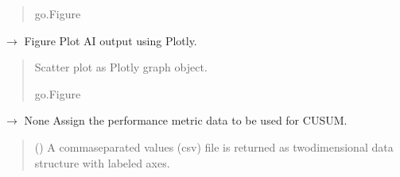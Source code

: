 \documentclass[letterpaper,10pt,oneside,english]{sphinxmanual}
\begin{document}
\begin{fulllineitems}
\begin{fulllineitems}
\begin{quote}
\begin{description}
\sphinxAtStartPar
go.Figure

\end{description}\end{quote}

\end{fulllineitems}


\begin{fulllineitems}
\label{\detokenize{ref_cusum:package.cusum.CUSUM.plot_input_metric_plotly_raw}}
\pysigstartsignatures
\pysiglinewithargsret
{}
{}
{{ $\rightarrow$ Figure}}
\pysigstopsignatures
\sphinxAtStartPar
Plot AI output using Plotly.
\begin{quote}\begin{description}
\sphinxAtStartPar
Scatter plot as Plotly graph object.

\sphinxAtStartPar
go.Figure

\end{description}\end{quote}

\end{fulllineitems}


\begin{fulllineitems}
\label{\detokenize{ref_cusum:package.cusum.CUSUM.set_df_metric_csv}}
\pysigstartsignatures
\pysiglinewithargsret
{}
{}
{{ $\rightarrow$ None}}
\pysigstopsignatures
\sphinxAtStartPar
Assign the performance metric data to be used for CUSUM.
\begin{quote}\begin{description}
\sphinxAtStartPar
{} () \textendash{} A comma\sphinxhyphen{}separated values (csv) file is returned as two\sphinxhyphen{}dimensional data structure with labeled axes.


\end{description}
\end{quote}
\end{fulllineitems}
\end{fulllineitems}
\end{document}
